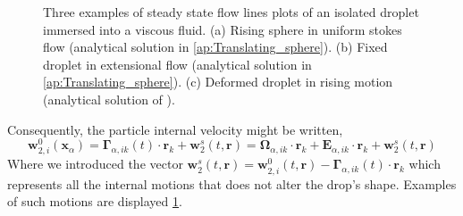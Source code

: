 \begin{figure}
    \centering
    \caption{Three examples of steady state flow lines plots of an isolated droplet immersed into a viscous fluid. 
    (a) Rising sphere in uniform stokes flow (analytical solution in \ref{ap:Translating_sphere}). 
    (b) Fixed droplet in extensional flow (analytical solution in \ref{ap:Translating_sphere}).
    (c) Deformed droplet in rising motion (analytical solution of \citet{taylor1964deformation}). }
    \label{fig:flowlines}
\end{figure}
Consequently, the particle internal velocity might be written, 
\begin{equation}
    \textbf{w}_{2,i}^0(\textbf{x}_\alpha)
    = \bm\Gamma_{\alpha,ik}(t) \cdot \textbf{r}_k
    + \textbf{w}^{s}_2(t,\textbf{r})
    =\bm{\Omega}_{\alpha,ik}\cdot \textbf{r}_k
    + \textbf{E}_{\alpha,ik} \cdot \textbf{r}_k
    + \textbf{w}^{s}_2(t,\textbf{r})
    \label{eq:def_vel}
\end{equation}
Where we introduced the vector $\textbf{w}^{s}_2(t,\textbf{r}) =\textbf{w}^{0}_{2,i}(t,\textbf{r})  - \bm\Gamma_{\alpha,ik}(t) \cdot \textbf{r}_k$ which represents all the internal motions that does not alter the drop's shape. 
Examples of such motions are displayed \ref{fig:flowlines}. 


